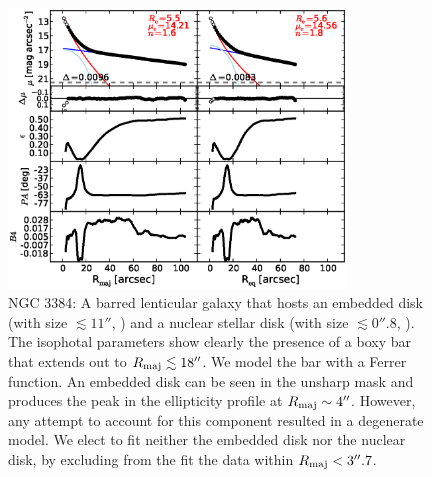 \documentclass[preprint2]{emulateapj}
\newcommand{\fitfigurewidth}{0.8\textwidth}
\begin{document}
  \begin{figure}[h]
  \begin{center}
  \includegraphics[width=\fitfigurewidth]{n3384_1Dfit.eps}
  \caption{NGC 3384: 
  A barred lenticular galaxy that hosts 
  an embedded disk (with size $\lesssim 11''$, \citealt{erwin2004}) and 
  a nuclear stellar disk (with size $\lesssim 0''.8$, \citealt{ledo2010}).
  The isophotal parameters show clearly the presence of a boxy bar that extends out to $R_{\rm maj} \lesssim 18''$.
  We model the bar with a Ferrer function.
  An embedded disk can be seen in the unsharp mask and produces the peak in the ellipticity profile at $R_{\rm maj} \sim 4''$.
  However, any attempt to account for this component resulted in a degenerate model.
  We elect to fit neither the embedded disk nor the nuclear disk, by excluding from the fit the data within $R_{\rm maj} < 3''.7$. 
  }
  \end{center}
  \end{figure}
\end{document}
